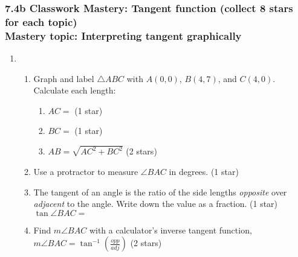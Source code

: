 \documentclass[12pt, twoside]{article}
\begin{document}
\subsubsection*{7.4b Classwork Mastery: Tangent function (collect 8 stars for each topic)\\[0.5cm]
Mastery topic: Interpreting tangent graphically}
  \begin{enumerate}
  \item \begin{enumerate}[itemsep=1.25cm]
    \item Graph and label $\triangle ABC$ with $A(0,0)$, $B(4,7)$, and $C(4,0)$. Calculate each length:
    \begin{multicols}{2}
      \begin{enumerate}
        \item $AC=$ \hfill (1 star)
        \item $BC=$ \hfill (1 star)
        \item $AB=\sqrt{AC^2+BC^2}$ \hfill (2 stars) \vspace{2cm}
      \end{enumerate}
    \begin{center}
    \end{center}
  \end{multicols}\vspace{2cm}
    \item Use a protractor to measure $\angle BAC$ in degrees.  \hfill (1 star)
    \item The tangent of an angle is the ratio of the side lengths \emph{opposite} over \emph{adjacent} to the angle. Write down the value as a fraction.  \hfill (1 star)\\[0.5cm]
      $\tan \angle BAC=$
    \item Find $m\angle BAC$ with a calculator's inverse tangent function,\\ $\displaystyle m \angle BAC = \tan^{-1}(\frac{opp}{adj})$  \hfill (2 stars)
    
  \end{enumerate}

\newpage

\end{enumerate}
\end{document}
